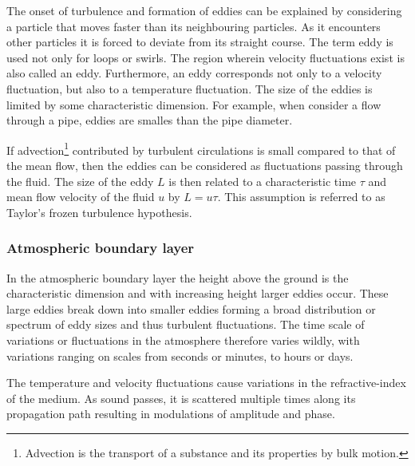 The onset of turbulence and formation of eddies can be explained by considering
a particle that moves faster than its neighbouring particles. As it encounters
other particles it is forced to deviate from its straight course. The term eddy
is used not only for loops or swirls. The region wherein velocity fluctuations
exist is also called an eddy. Furthermore, an eddy corresponds not only to a velocity
fluctuation, but also to a temperature fluctuation.
The size of the eddies is limited by some characteristic dimension. For example,
when consider a flow through a pipe, eddies are smalles than the pipe diameter.

If advection\footnote{Advection is the transport of a substance and its properties by bulk motion.} contributed by turbulent circulations is small compared to that of
the mean flow, then the eddies can be considered as  fluctuations
passing through the fluid. The size of the eddy $L$ is then related to a
characteristic time $\tau$ and mean flow velocity of the fluid $u$ by $L = u
\tau$. This assumption is referred to as Taylor's frozen turbulence hypothesis.

\subsubsection*{Atmospheric boundary layer}
In the atmospheric boundary layer the height above the ground is the
characteristic dimension and with increasing height larger eddies occur. These
large eddies break down into smaller eddies forming a broad distribution or
spectrum of eddy sizes and thus turbulent fluctuations. The time scale of
variations or fluctuations in the atmosphere therefore varies wildly, with
variations ranging on scales from seconds or minutes, to hours or days.

The temperature and velocity fluctuations cause variations in the
refractive-index of the medium. As sound passes, it is scattered multiple times
along its propagation path resulting in modulations of amplitude and phase.


